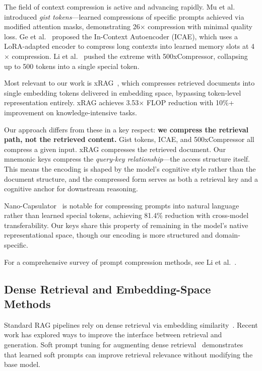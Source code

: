 \documentclass{article}
\begin{document}
The field of context compression is active and advancing rapidly. Mu et al.~\cite{mu2023gist} introduced \textit{gist tokens}---learned compressions of specific prompts achieved via modified attention masks, demonstrating 26$\times$ compression with minimal quality loss. Ge et al.~\cite{ge2024icae} proposed the In-Context Autoencoder (ICAE), which uses a LoRA-adapted encoder to compress long contexts into learned memory slots at 4$\times$ compression. Li et al.~\cite{li2025500x} pushed the extreme with 500xCompressor, collapsing up to 500 tokens into a single special token.

Most relevant to our work is xRAG~\cite{cheng2024xrag}, which compresses retrieved documents into single embedding tokens delivered in embedding space, bypassing token-level representation entirely. xRAG achieves 3.53$\times$ FLOP reduction with 10\%+ improvement on knowledge-intensive tasks.

Our approach differs from these in a key respect: \textbf{we compress the retrieval path, not the retrieved content.} Gist tokens, ICAE, and 500xCompressor all compress a given input. xRAG compresses the retrieved document. Our mnemonic keys compress the \textit{query-key relationship}---the access structure itself. This means the encoding is shaped by the model's cognitive style rather than the document structure, and the compressed form serves as both a retrieval key and a cognitive anchor for downstream reasoning.

Nano-Capsulator~\cite{nanocapsulator2024} is notable for compressing prompts into natural language rather than learned special tokens, achieving 81.4\% reduction with cross-model transferability. Our keys share this property of remaining in the model's native representational space, though our encoding is more structured and domain-specific.

For a comprehensive survey of prompt compression methods, see Li et al.~\cite{li2025survey}.

\subsection{Dense Retrieval and Embedding-Space Methods}

Standard RAG pipelines rely on dense retrieval via embedding similarity~\cite{lewis2020rag, reimers2019sentencebert}. Recent work has explored ways to improve the interface between retrieval and generation. Soft prompt tuning for augmenting dense retrieval~\cite{softprompt2023} demonstrates that learned soft prompts can improve retrieval relevance without modifying the base model.
\end{document}
